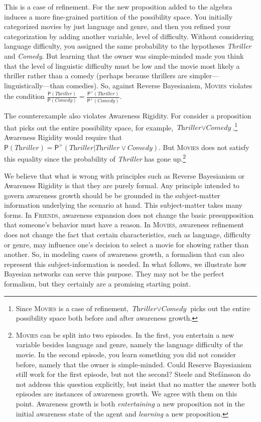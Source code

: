 \documentclass[
  11pt,
  dvipsnames,enabledeprecatedfontcommands]{scrartcl}
\newcommand{\pr}[1]{\ensuremath{\mathsf{P}(#1)}}
\newcommand{\ppr}[2]{\ensuremath{\mathsf{P}^{#1}(#2)}}
\begin{document}
\doublespace

\noindent This is a case of refinement. For the new proposition added to
the algebra induces a more fine-grained partition of the possibility
space. You initially categorized movies by just language and genre, and
then you refined your categorization by adding another variable, level
of difficulty. Without considering language difficulty, you assigned the
same probability to the hypotheses \textit{Thriller} and
\textit{Comedy}. But learning that the owner was simple-minded made you
think that the level of linguistic difficulty must be low and the movie
most likely a thriller rather than a comedy (perhaps because thrillers
are simpler---linguistically---than comedies). So, against Reverse
Bayesianism, \textsc{Movies} violates the condition
\(\frac{\pr{\textit{Thriller}}}{\pr{\textit{Comedy}}}=\frac{\ppr{+}{\textit{Thriller}}}{\ppr{+}{\textit{Comedy}}}\).

The counterexample also violates Awareness Rigidity. For consider a
proposition that picks out the entire possibility space, for example,
\(\textit{Thriller}\vee \textit{Comedy}\).\footnote{Since
  \textsc{Movies} is a case of refinement,
  \(\textit{Thriller}\vee \textit{Comedy}\) picks out the entire
  possibility space both before and after awareness growth.} Awareness
Rigidity would require that
\(\pr{\textit{Thriller}}=\ppr{+}{\textit{Thriller} \vert \textit{Thriller}\vee \textit{Comedy}}\).
But \textsc{Movies} does not satisfy this equality since the probability
of \textit{Thriller} has gone up.\footnote{\textsc{Movies} can be split
  into two episodes. In the first, you entertain a new variable besides
  language and genre, namely the language difficulty of the movie. In
  the second episode, you learn something you did not consider before,
  namely that the owner is simple-minded. Could Reserve Bayesianism
  still work for the first episode, but not the second? Steele and
  Stefánsson do not address this question explicitly, but insist that no
  matter the answer both episodes are instances of awareness growth. We
  agree with them on this point. Awareness growth is both
  \textit{entertaining} a new proposition not in the initial awareness
  state of the agent and \textit{learning} a new proposition.}

We believe that what is wrong with principles such as Reverse
Bayesianism or Awareness Rigidity is that they are purely formal. Any
principle intended to govern awareness growth should be be grounded in
the subject-matter information underlying the scenario at hand. This
subject-matter takes many forms. In \textsc{Friends}, awareness
expansion does not change the basic presupposition that someone's
behavior must have a reason. In \textsc{Movies}, awareness refinement
does not change the fact that certain characteristics, such as language,
difficulty or genre, may influence one's decision to select a movie for
showing rather than another. So, in modeling cases of awareness growth,
a formalism that can also represent this subject-information is needed.
In what follows, we illustrate how Bayesian networks can serve this
purpose. They may not be the perfect formalism, but they certainly are a
promising starting point.
\end{document}

